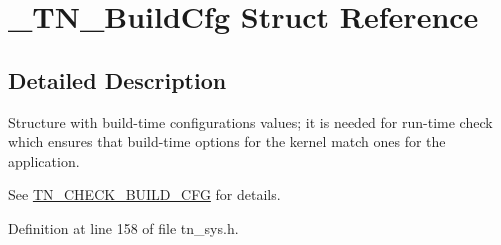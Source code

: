 \hypertarget{struct__TN__BuildCfg}{\section{\+\_\+\+T\+N\+\_\+\+Build\+Cfg Struct Reference}
\label{struct__TN__BuildCfg}
}


\subsection{Detailed Description}
Structure with build-\/time configurations values; it is needed for run-\/time check which ensures that build-\/time options for the kernel match ones for the application. 

See {\ttfamily \hyperlink{tn__cfg__default_8h_aacdc913eb66492cf69cf02a5de73578e}{T\+N\+\_\+\+C\+H\+E\+C\+K\+\_\+\+B\+U\+I\+L\+D\+\_\+\+C\+F\+G}} for details. 

Definition at line 158 of file tn\+\_\+sys.\+h.

